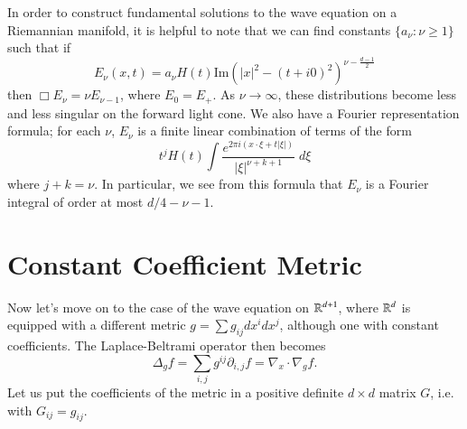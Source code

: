 In order to construct fundamental solutions to the wave equation on a Riemannian manifold, it is helpful to note that we can find constants $\{ a_\nu : \nu \geq 1 \}$ such that if
%
\[ E_\nu(x,t) = a_\nu H(t) \text{Im}(|x|^2 - (t + i0)^2)^{\nu - \frac{d-1}{2}} \] 
%
then $\Box E_\nu = \nu E_{\nu - 1}$, where $E_0 = E_+$. As $\nu \to \infty$, these distributions become less and less singular on the forward light cone. We also have a Fourier representation formula; for each $\nu$, $E_\nu$ is a finite linear combination of terms of the form
%
\[ t^j H(t) \int \frac{e^{2 \pi i (x \cdot \xi + t |\xi|)}}{|\xi|^{\nu + k + 1}}\; d\xi \]
%
where $j + k = \nu$. In particular, we see from this formula that $E_\nu$ is a Fourier integral of order at most $d/4 - \nu - 1$.

\section{Constant Coefficient Metric}

Now let's move on to the case of the wave equation on $\operatorname{\mathbb{R}}^{d+1}$, where $\operatorname{\mathbb{R}}^d$ is equipped with a different metric $g = \sum g_{ij} dx^i dx^j$, although one with constant coefficients. The Laplace-Beltrami operator then becomes
%
\[ \Delta_g f = \sum_{i,j} g^{ij} \partial_{i,j} f = \nabla_x \cdot \nabla_g f. \]
%
Let us put the coefficients of the metric in a positive definite $d \times d$ matrix $G$, i.e. with $G_{ij} = g_{ij}$.

